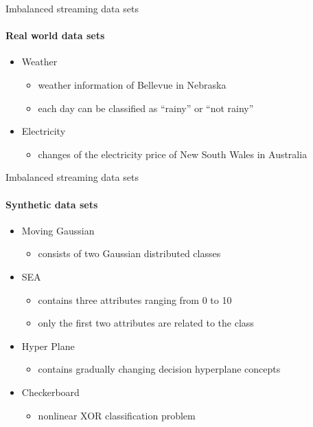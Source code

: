 
\begin{frame}{Imbalanced streaming data sets}
\framesubtitle{Real world data sets}

\begin{itemize}
    \item Weather
    \begin{itemize}
        \item weather information of Bellevue in Nebraska
        \item each day can be classified as \enquote{rainy} or \enquote{not rainy}
    \end{itemize}
    \item Electricity
    \begin{itemize}
        \item changes of the electricity price of New South Wales in Australia
    \end{itemize}
\end{itemize}

\end{frame}


\begin{frame}{Imbalanced streaming data sets}
\framesubtitle{Synthetic data sets}

\begin{itemize}
    \item Moving Gaussian
    \begin{itemize}
        \item consists of two Gaussian distributed classes
    \end{itemize}
    \item SEA
    \begin{itemize}
        \item contains three attributes ranging from 0 to 10
        \item only the first two attributes are related to the class
    \end{itemize}
    \item Hyper Plane
    \begin{itemize}
        \item contains gradually changing decision hyperplane concepts
    \end{itemize}
    \item Checkerboard
    \begin{itemize}
        \item nonlinear XOR classification problem
    \end{itemize}
\end{itemize}

\end{frame}


